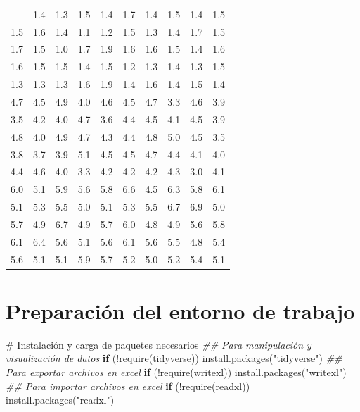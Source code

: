 \documentclass[
  spanish,
  letterpaper,
]{book}
\newenvironment{Shaded}{\begin{snugshade}}{\end{snugshade}}
\newcommand{\CommentTok}[1]{\textcolor[rgb]{0.37,0.37,0.37}{#1}}
\newcommand{\ControlFlowTok}[1]{\textcolor[rgb]{0.00,0.23,0.31}{\textbf{#1}}}
\newcommand{\DocumentationTok}[1]{\textcolor[rgb]{0.37,0.37,0.37}{\textit{#1}}}
\newcommand{\FunctionTok}[1]{\textcolor[rgb]{0.28,0.35,0.67}{#1}}
\newcommand{\NormalTok}[1]{\textcolor[rgb]{0.00,0.23,0.31}{#1}}
\newcommand{\SpecialCharTok}[1]{\textcolor[rgb]{0.37,0.37,0.37}{#1}}
\newcommand{\StringTok}[1]{\textcolor[rgb]{0.13,0.47,0.30}{#1}}
\begin{document}
\begin{longtable}[]{@{}llllllllll@{}}
\toprule\noalign{}
\endhead
\bottomrule\noalign{}
\endlastfoot
1.4 & 1.4 & 1.3 & 1.5 & 1.4 & 1.7 & 1.4 & 1.5 & 1.4 & 1.5 \\
1.5 & 1.6 & 1.4 & 1.1 & 1.2 & 1.5 & 1.3 & 1.4 & 1.7 & 1.5 \\
1.7 & 1.5 & 1.0 & 1.7 & 1.9 & 1.6 & 1.6 & 1.5 & 1.4 & 1.6 \\
1.6 & 1.5 & 1.5 & 1.4 & 1.5 & 1.2 & 1.3 & 1.4 & 1.3 & 1.5 \\
1.3 & 1.3 & 1.3 & 1.6 & 1.9 & 1.4 & 1.6 & 1.4 & 1.5 & 1.4 \\
4.7 & 4.5 & 4.9 & 4.0 & 4.6 & 4.5 & 4.7 & 3.3 & 4.6 & 3.9 \\
3.5 & 4.2 & 4.0 & 4.7 & 3.6 & 4.4 & 4.5 & 4.1 & 4.5 & 3.9 \\
4.8 & 4.0 & 4.9 & 4.7 & 4.3 & 4.4 & 4.8 & 5.0 & 4.5 & 3.5 \\
3.8 & 3.7 & 3.9 & 5.1 & 4.5 & 4.5 & 4.7 & 4.4 & 4.1 & 4.0 \\
4.4 & 4.6 & 4.0 & 3.3 & 4.2 & 4.2 & 4.2 & 4.3 & 3.0 & 4.1 \\
6.0 & 5.1 & 5.9 & 5.6 & 5.8 & 6.6 & 4.5 & 6.3 & 5.8 & 6.1 \\
5.1 & 5.3 & 5.5 & 5.0 & 5.1 & 5.3 & 5.5 & 6.7 & 6.9 & 5.0 \\
5.7 & 4.9 & 6.7 & 4.9 & 5.7 & 6.0 & 4.8 & 4.9 & 5.6 & 5.8 \\
6.1 & 6.4 & 5.6 & 5.1 & 5.6 & 6.1 & 5.6 & 5.5 & 4.8 & 5.4 \\
5.6 & 5.1 & 5.1 & 5.9 & 5.7 & 5.2 & 5.0 & 5.2 & 5.4 & 5.1 \\
\end{longtable}

\section{Preparación del entorno de
trabajo}\label{preparaciuxf3n-del-entorno-de-trabajo}

\begin{Shaded}
\begin{Highlighting}[]
\CommentTok{\# Instalación y carga de paquetes necesarios}
\DocumentationTok{\#\# Para manipulación y visualización de datos}
\ControlFlowTok{if}\NormalTok{ (}\SpecialCharTok{!}\FunctionTok{require}\NormalTok{(tidyverse)) }\FunctionTok{install.packages}\NormalTok{(}\StringTok{"tidyverse"}\NormalTok{)}
\DocumentationTok{\#\# Para exportar archivos en excel}
\ControlFlowTok{if}\NormalTok{ (}\SpecialCharTok{!}\FunctionTok{require}\NormalTok{(writexl)) }\FunctionTok{install.packages}\NormalTok{(}\StringTok{"writexl"}\NormalTok{)}
\DocumentationTok{\#\# Para importar archivos en excel}
\ControlFlowTok{if}\NormalTok{ (}\SpecialCharTok{!}\FunctionTok{require}\NormalTok{(readxl)) }\FunctionTok{install.packages}\NormalTok{(}\StringTok{"readxl"}\NormalTok{)}
\end{Highlighting}
\end{Shaded}
\end{document}
